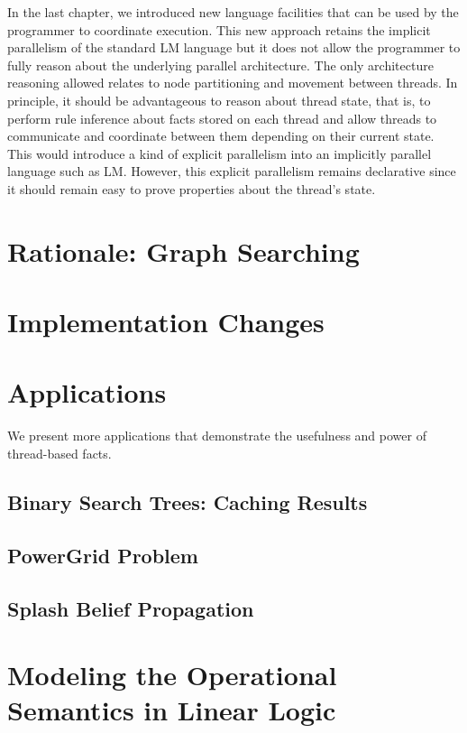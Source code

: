 In the last chapter, we introduced new language facilities that can be used by
the programmer to coordinate execution. This new approach retains the implicit
parallelism of the standard LM language but it does not allow the programmer to
fully reason about the underlying parallel architecture. The only architecture
reasoning allowed relates to node partitioning and movement between threads. In
principle, it should be advantageous to reason about thread state, that is, to
perform rule inference about facts stored on each thread and allow threads to
communicate and coordinate between them depending on their current state. This
would introduce a kind of explicit parallelism into an implicitly parallel
language such as LM. However, this explicit parallelism remains declarative
since it should remain easy to prove properties about the thread's state.

\section{Rationale: Graph Searching}


\section{Implementation Changes}


\section{Applications}

We present more applications that demonstrate the usefulness and power of thread-based facts.

\subsection{Binary Search Trees: Caching Results}


\subsection{PowerGrid Problem}


\subsection{Splash Belief Propagation}


\section{Modeling the Operational Semantics in Linear Logic}
